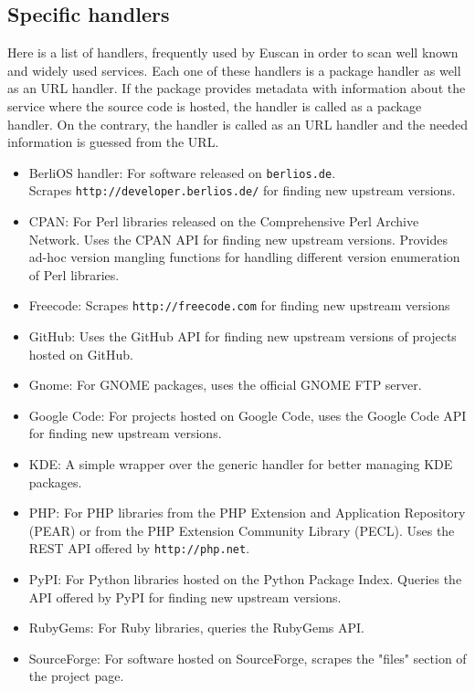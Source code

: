 \subsection{Specific handlers}
Here is a list of handlers, frequently used by Euscan in order to scan well known and widely used services. Each one of these handlers is a package handler as well as an URL handler. If the package provides metadata with information about the service where the source code is hosted, the handler is called as a package handler. On the contrary, the handler is called as an URL handler and the needed information is guessed from the URL.

\begin{itemize}
\item BerliOS handler: For software released on \texttt{berlios.de}. \\ Scrapes \texttt{http://developer.berlios.de/} for finding new upstream versions.

\item CPAN: For Perl libraries released on the Comprehensive Perl Archive Network. Uses the CPAN API for finding new upstream versions. Provides ad-hoc version mangling functions for handling different version enumeration of Perl libraries.

\item Freecode: Scrapes \texttt{http://freecode.com} for finding new upstream versions

\item GitHub: Uses the GitHub API for finding new upstream versions of projects hosted on GitHub.

\item Gnome: For GNOME packages, uses the official GNOME FTP server.

\item Google Code: For projects hosted on Google Code, uses the Google Code API for finding new upstream versions.

\item KDE: A simple wrapper over the generic handler for better managing KDE packages.

\item PHP: For PHP libraries from the PHP Extension and Application Repository (PEAR) or from the PHP Extension Community Library (PECL). Uses the REST API offered by \texttt{http://php.net}.

\item PyPI: For Python libraries hosted on the Python Package Index. Queries the API offered by PyPI for finding new upstream versions.

\item RubyGems: For Ruby libraries, queries the RubyGems  API.

\item SourceForge: For software hosted on SourceForge, scrapes the "files" section of the project page.
\end{itemize}


